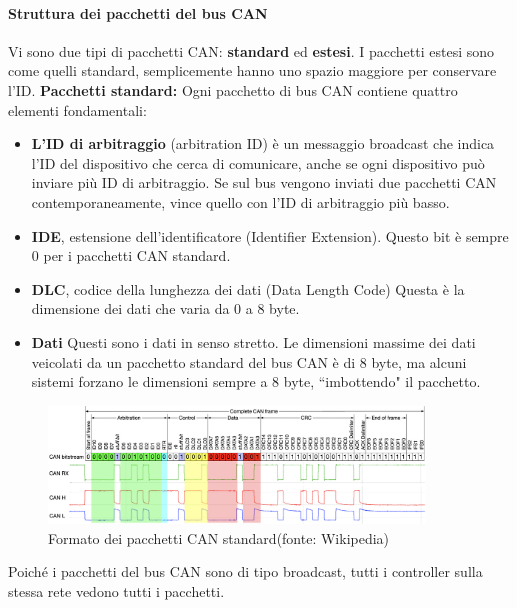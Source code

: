 \documentclass[12pt, a4paper, italian]{report}
\numberwithin{figure}{chapter}
\numberwithin{table}{chapter}
\begin{document}
\paragraph{Struttura dei pacchetti del bus CAN}
Vi sono due tipi di pacchetti CAN: 
\textbf{standard} ed \textbf{estesi}. I pacchetti estesi sono come quelli standard, semplicemente hanno uno spazio maggiore per conservare l'ID. \textbf{Pacchetti standard:} Ogni pacchetto di bus CAN contiene quattro elementi fondamentali:
\begin{itemize}
    \item \textbf{L'ID di arbitraggio} (arbitration ID) è un messaggio broadcast che indica l'ID del dispositivo che cerca di comunicare, anche se ogni dispositivo può inviare più ID di arbitraggio. Se sul bus vengono inviati due pacchetti CAN contemporaneamente, vince quello con l'ID di arbitraggio più basso.
    \item \textbf{IDE}, estensione dell'identificatore (Identifier Extension). Questo bit è sempre 0 per i pacchetti CAN standard.
    \item \textbf{DLC}, codice della lunghezza dei dati (Data Length Code) Questa è la dimensione dei dati che varia da 0 a 8 byte.
    \item \textbf{Dati} Questi sono i dati in senso stretto. Le dimensioni massime dei dati veicolati da un pacchetto standard del bus CAN è di 8 byte, ma alcuni sistemi forzano le dimensioni sempre a 8 byte, ``imbottendo" il pacchetto.
\end{itemize}

\begin{figure}[h]
  \centering
  \includegraphics[width=10cm]{FrameCAN.png}
  \caption{Formato dei pacchetti CAN standard\protect\footnotemark (fonte: Wikipedia)}
  \label{fig:pacchettoCAN}
\end{figure}

Poiché i pacchetti del bus CAN sono di tipo broadcast, tutti i controller sulla stessa rete vedono tutti i pacchetti. 
\end{document}
